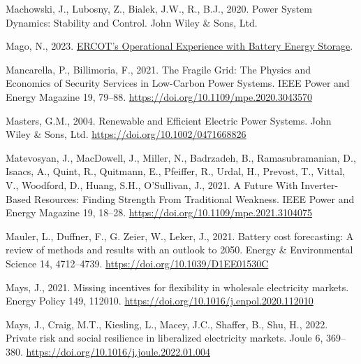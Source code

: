 \documentclass[12pt,a4paper,]{report}
\newlength{\cslhangindent}
\newenvironment{CSLReferences}[2] %
 {%
  \setlength{\parindent}{0pt}
  \ifodd #1 \everypar{\setlength{\hangindent}{\cslhangindent}}\ignorespaces\fi
  \ifnum #2 > 0
  \setlength{\parskip}{#2\baselineskip}
  \fi
 }%
 {}
\begin{document}
\begin{CSLReferences}{1}{0}
\leavevmode{}%
Machowski, J., Lubosny, Z., Bialek, J.W., R., B.J., 2020. Power {System
Dynamics}: {Stability} and {Control}. {John Wiley \& Sons, Ltd}.

\leavevmode{}%
Mago, N., 2023.
\href{https://www.esig.energy/event/g-pst-esig-webinar-series-operational-experience-with-battery-energy-storage-in-ercot/}{{ERCOT}'s
{Operational Experience} with {Battery Energy Storage}}.

\leavevmode{}%
Mancarella, P., Billimoria, F., 2021. The {Fragile Grid}: {The Physics}
and {Economics} of {Security Services} in {Low-Carbon Power Systems}.
IEEE Power and Energy Magazine 19, 79--88.
\url{https://doi.org/10.1109/mpe.2020.3043570}

\leavevmode{}%
Masters, G.M., 2004. Renewable and {Efficient Electric Power Systems}.
{John Wiley \& Sons, Ltd}. \url{https://doi.org/10.1002/0471668826}

\leavevmode{}%
Matevosyan, J., MacDowell, J., Miller, N., Badrzadeh, B.,
Ramasubramanian, D., Isaacs, A., Quint, R., Quitmann, E., Pfeiffer, R.,
Urdal, H., Prevost, T., Vittal, V., Woodford, D., Huang, S.H.,
O'Sullivan, J., 2021. A {Future With Inverter-Based Resources}: {Finding
Strength From Traditional Weakness}. IEEE Power and Energy Magazine 19,
18--28. \url{https://doi.org/10.1109/mpe.2021.3104075}

\leavevmode{}%
Mauler, L., Duffner, F., G. Zeier, W., Leker, J., 2021. Battery cost
forecasting: A review of methods and results with an outlook to 2050.
Energy \& Environmental Science 14, 4712--4739.
\url{https://doi.org/10.1039/D1EE01530C}

\leavevmode{}%
Mays, J., 2021. Missing incentives for flexibility in wholesale
electricity markets. Energy Policy 149, 112010.
\url{https://doi.org/10.1016/j.enpol.2020.112010}

\leavevmode{}%
Mays, J., Craig, M.T., Kiesling, L., Macey, J.C., Shaffer, B., Shu, H.,
2022. Private risk and social resilience in liberalized electricity
markets. Joule 6, 369--380.
\url{https://doi.org/10.1016/j.joule.2022.01.004}


\end{CSLReferences}
\end{document}
